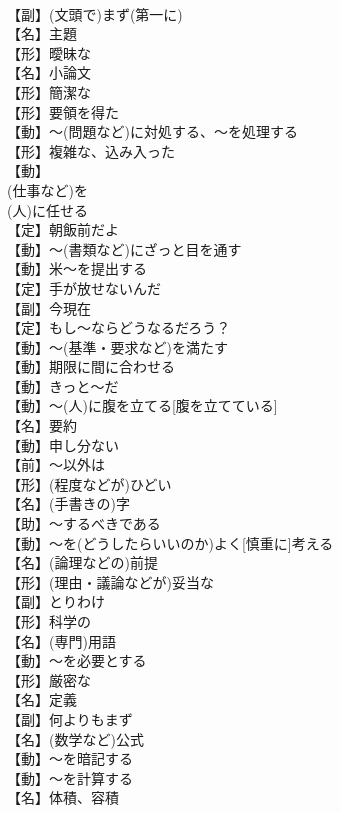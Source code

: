 \documentclass[8pt]{extreport}
\begin{document}
\begin{CJK}{UTF8}{min}
\\	【副】(文頭で)まず(第一に)
\\	【名】主題
\\	【形】曖昧な
\\	【名】小論文
\\	【形】簡潔な
\\	【形】要領を得た
\\	【動】～(問題など)に対処する、～を処理する
\\	【形】複雑な、込み入った
\\	【動】
\\	(仕事など)を
\\	(人)に任せる
\\	【定】朝飯前だよ
\\	【動】～(書類など)にざっと目を通す
\\	【動】{米}～を提出する
\\	【定】手が放せないんだ
\\	【副】今現在
\\	【定】もし～ならどうなるだろう？
\\	【動】～(基準・要求など)を満たす
\\	【動】期限に間に合わせる
\\	【動】きっと～だ
\\	【動】～(人)に腹を立てる[腹を立てている]
\\	【名】要約
\\	【動】申し分ない
\\	【前】～以外は
\\	【形】(程度などが)ひどい
\\	【名】(手書きの)字
\\	【助】～するべきである
\\	【動】～を(どうしたらいいのか)よく[慎重に]考える
\\	【名】(論理などの)前提
\\	【形】(理由・議論などが)妥当な
\\	【副】とりわけ
\\	【形】科学の
\\	【名】(専門)用語
\\	【動】～を必要とする
\\	【形】厳密な
\\	【名】定義
\\	【副】何よりもまず
\\	【名】(数学など)公式
\\	【動】～を暗記する
\\	【動】～を計算する
\\	【名】体積、容積

\end{CJK}
\end{document}

